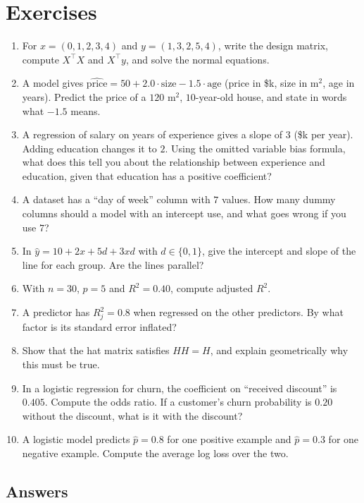 \section{Exercises}
\label{sec:mlr-exercises}

\begin{enumerate}
  \item For $x = (0,1,2,3,4)$ and $y = (1,3,2,5,4)$, write the design matrix, compute
  $X^\top X$ and $X^\top y$, and solve the normal equations.
  \item A model gives $\widehat{\text{price}} = 50 + 2.0\cdot\text{size} - 1.5\cdot\text{age}$
  (price in \$k, size in m$^2$, age in years). Predict the price of a $120$ m$^2$,
  $10$-year-old house, and state in words what $-1.5$ means.
  \item A regression of salary on years of experience gives a slope of $3$ (\$k per year).
  Adding education changes it to $2$. Using the omitted variable bias formula, what does
  this tell you about the relationship between experience and education, given that
  education has a positive coefficient?
  \item A dataset has a ``day of week'' column with $7$ values. How many dummy columns
  should a model with an intercept use, and what goes wrong if you use $7$?
  \item In $\hat y = 10 + 2x + 5d + 3xd$ with $d\in\{0,1\}$, give the intercept and slope
  of the line for each group. Are the lines parallel?
  \item With $n = 30$, $p = 5$ and $R^2 = 0.40$, compute adjusted $R^2$.
  \item A predictor has $R_j^2 = 0.8$ when regressed on the other predictors. By what
  factor is its standard error inflated?
  \item Show that the hat matrix satisfies $HH = H$, and explain geometrically why this
  must be true.
  \item In a logistic regression for churn, the coefficient on ``received discount'' is
  $0.405$. Compute the odds ratio. If a customer's churn probability is $0.20$ without the
  discount, what is it with the discount?
  \item A logistic model predicts $\hat p = 0.8$ for one positive example and
  $\hat p = 0.3$ for one negative example. Compute the average log loss over the two.
\end{enumerate}

\subsection*{Answers}

